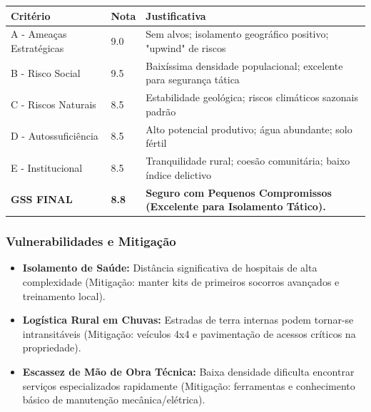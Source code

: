 \begin{table}[ht!]
\small \begin{tabular}{p{3.0cm}p{0.8cm}p{6.0cm}} \toprule
\textbf{Critério} & \textbf{Nota} & \textbf{Justificativa} \\ \midrule
A - Ameaças Estratégicas & 9.0 & Sem alvos; isolamento geográfico positivo; "upwind" de riscos \\
B - Risco Social & 9.5 & Baixíssima densidade populacional; excelente para segurança tática \\
C - Riscos Naturais & 8.5 & Estabilidade geológica; riscos climáticos sazonais padrão \\
D - Autossuficiência & 8.5 & Alto potencial produtivo; água abundante; solo fértil \\
E - Institucional & 8.5 & Tranquilidade rural; coesão comunitária; baixo índice delictivo \\
\midrule \textbf{GSS FINAL} & \textbf{8.8} & \textbf{Seguro com Pequenos Compromissos (Excelente para Isolamento Tático).} \\ \bottomrule \end{tabular}
\end{table}
\subsubsection{Vulnerabilidades e
Mitigação}

\begin{itemize}
\tightlist
\item
  \textbf{Isolamento de Saúde:} Distância significativa de hospitais de
  alta complexidade (Mitigação: manter kits de primeiros socorros
  avançados e treinamento local).
\item
  \textbf{Logística Rural em Chuvas:} Estradas de terra internas podem
  tornar-se intransitáveis (Mitigação: veículos 4x4 e pavimentação de
  acessos críticos na propriedade).
\item
  \textbf{Escassez de Mão de Obra Técnica:} Baixa densidade dificulta
  encontrar serviços especializados rapidamente (Mitigação: ferramentas
  e conhecimento básico de manutenção mecânica/\allowbreak elétrica).
\end{itemize}

